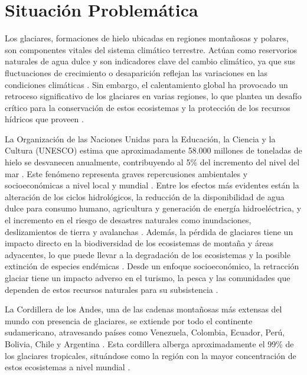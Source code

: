 \section{Situación Problemática}

\label{sec:SituacionProblematica}

Los glaciares, formaciones de hielo ubicadas en regiones montañosas y polares, son componentes vitales del sistema climático terrestre. Actúan como reservorios naturales de agua dulce y son indicadores clave del cambio climático, ya que sus fluctuaciones de crecimiento o desaparición reflejan las variaciones en las condiciones climáticas \cite{johansen2019atlas}. Sin embargo, el calentamiento global ha provocado un retroceso significativo de los glaciares en varias regiones, lo que plantea un desafío crítico para la conservación de estos ecosistemas y la protección de los recursos hídricos que proveen \cite{ali2023intimidating, rounce2023global}.

La Organización de las Naciones Unidas para la Educación, la Ciencia y la Cultura (UNESCO) estima que aproximadamente 58.000 millones de toneladas de hielo se desvanecen anualmente, contribuyendo al 5\% del incremento del nivel del mar \cite{carvalho2022world}. Este fenómeno representa graves repercusiones ambientales y socioeconómicas a nivel local y mundial \cite{mark2017glacier, nie2021glacial, clague2023impacts}. Entre los efectos más evidentes están la alteración de los ciclos hidrológicos, la reducción de la disponibilidad de agua dulce para consumo humano, agricultura y generación de energía hidroeléctrica, y el incremento en el riesgo de desastres naturales como inundaciones, deslizamientos de tierra y avalanchas \cite{motschmann2020losses}. Además, la pérdida de glaciares tiene un impacto directo en la biodiversidad de los ecosistemas de montaña y áreas adyacentes, lo que puede llevar a la degradación de los ecosistemas y la posible extinción de especies endémicas \cite{palomo2017climate}. Desde un enfoque socioeconómico, la retracción glaciar tiene un impacto adverso en el turismo, la pesca y las comunidades que dependen de estos recursos naturales para su subsistencia \cite{rasul2019global}.

La Cordillera de los Andes, una de las cadenas montañosas más extensas del mundo con presencia de glaciares, se extiende por todo el continente sudamericano, atravesando países como Venezuela, Colombia, Ecuador, Perú, Bolivia, Chile y Argentina \cite{johansen2019atlas}. Esta cordillera alberga aproximadamente el 99\% de los glaciares tropicales, situándose como la región con la mayor concentración de estos ecosistemas a nivel mundial \cite{veettil2019global}.

